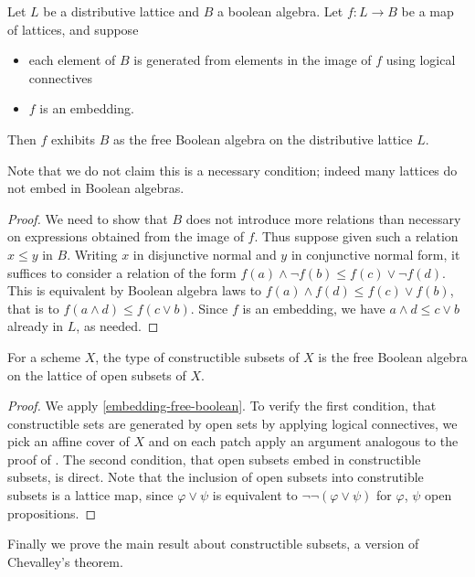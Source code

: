 \begin{lemma}\label{embedding-free-boolean}
  Let $L$ be a distributive lattice and $B$ a boolean algebra. Let $f : L \to B$ be a map of
  lattices, and suppose
  \begin{itemize}
  \item each element of $B$ is generated from elements in the image of $f$ using logical connectives
  \item $f$ is an embedding.
  \end{itemize}
  Then $f$ exhibits $B$ as the free Boolean algebra on the distributive lattice $L$.
  \end{lemma}
Note that we do not claim this is a necessary condition; indeed many lattices do not embed in
Boolean algebras.
\begin{proof}
  We need to show that $B$ does not introduce more relations than necessary on expressions
  obtained from the image of $f$.
  Thus suppose given such a relation $x \le y$ in $B$. Writing $x$ in disjunctive normal and $y$ in conjunctive
  normal form, it suffices to consider a relation of the form
  $f(a) \wedge \neg f(b) \le f(c) \vee \neg f(d)$.
  This is equivalent by Boolean algebra laws to $f(a) \wedge f(d) \le f(c) \vee f(b)$, that is
  to $f(a \wedge d) \le f(c \vee b)$. Since $f$ is an embedding, we have $a \wedge d \le c \vee b$ already in $L$,
  as needed.
\end{proof}

\begin{theorem}\label{constructible-free-boolean}
  For a scheme $X$, the type of constructible subsets of $X$ is the free Boolean algebra on the lattice
  of open subsets of $X$.
\end{theorem}
\begin{proof}
  We apply \cref{embedding-free-boolean}. To verify the first condition, that constructible
  sets are generated by open sets by applying logical connectives, we pick an affine cover of
  $X$ and on each patch apply an argument analogous to the proof of
  \cite[Theorem 4.2.7]{draft}.
  The second condition, that open subsets embed in constructible subsets, is direct.
  Note that the inclusion of open subsets into construtible subsets is a lattice map,
  since $\varphi \vee \psi$ is equivalent to $\neg \neg (\varphi \vee \psi)$ for
  $\varphi$, $\psi$ open propositions.
\end{proof}

Finally we prove the main result about constructible subsets, a version of Chevalley's theorem.

